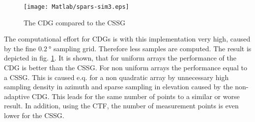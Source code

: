 \begin{figure}[h]
\centering
\texttt{[image: Matlab/spars-sim3.eps]}
\caption{The CDG compared to the CSSG}
\label{fig:cdg}
\end{figure}

The computational effort for \acp{CDG} is with this implementation very high, caused by the fine $\SI{0.2}{\degree}$ sampling grid. Therefore less samples are computed. The result is depicted in fig. \ref{fig:cdg}. It is shown, that for uniform arrays the performance of the \ac{CDG} is better than the \ac{CSSG}. For non uniform arrays the performance equal to a \ac{CSSG}. This is caused e.q. for a non quadratic array by unnecessary high sampling density in azimuth and sparse sampling in elevation caused by the non-adaptive \ac{CDG}. This leads for the same number of points to a similar or worse result. In addition, using the \ac{CTF}, the number of measurement points is even lower for the \ac{CSSG}.



